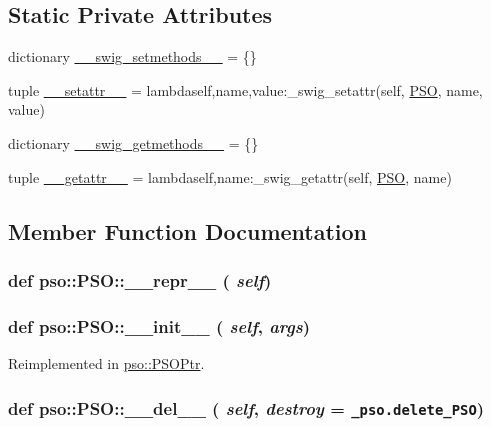 \subsection*{Static Private Attributes}
\begin{CompactItemize}
\item 
dictionary \hyperlink{classpso_1_1PSO_9b9529b86719f29355bd164b670caee9}{\_\-\_\-swig\_\-setmethods\_\-\_\-} = \{\}
\item 
tuple \hyperlink{classpso_1_1PSO_b930bfec249a4f55df08ab0185e000a5}{\_\-\_\-setattr\_\-\_\-} = lambdaself,name,value:\_\-swig\_\-setattr(self, \hyperlink{classpso_1_1PSO}{PSO}, name, value)
\item 
dictionary \hyperlink{classpso_1_1PSO_db5792f0b3f1752edef791c69fb42812}{\_\-\_\-swig\_\-getmethods\_\-\_\-} = \{\}
\item 
tuple \hyperlink{classpso_1_1PSO_672d2392549b45dd0bbbabbfd77a9a18}{\_\-\_\-getattr\_\-\_\-} = lambdaself,name:\_\-swig\_\-getattr(self, \hyperlink{classpso_1_1PSO}{PSO}, name)
\end{CompactItemize}


\subsection{Member Function Documentation}
\hypertarget{classpso_1_1PSO_0225f828ac29fe3bb87a9a3be43dcc17}{
\subsubsection{\setlength{\rightskip}{0pt plus 5cm}def pso::PSO::\_\-\_\-repr\_\-\_\- ( {\em self})}}
\label{classpso_1_1PSO_0225f828ac29fe3bb87a9a3be43dcc17}


\hypertarget{classpso_1_1PSO_27a5c2096805e771388694c18aba01e0}{
\subsubsection{\setlength{\rightskip}{0pt plus 5cm}def pso::PSO::\_\-\_\-init\_\-\_\- ( {\em self}, \/   {\em args})}}
\label{classpso_1_1PSO_27a5c2096805e771388694c18aba01e0}




Reimplemented in \hyperlink{classpso_1_1PSOPtr_ef60e75e878d40de18fecc0758282744}{pso::PSOPtr}.\hypertarget{classpso_1_1PSO_051b2a3a8d5cd4a513969e3158d1ff40}{
\subsubsection{\setlength{\rightskip}{0pt plus 5cm}def pso::PSO::\_\-\_\-del\_\-\_\- ( {\em self}, \/   {\em destroy} = {\tt \_\-pso.delete\_\-PSO})}}
\label{classpso_1_1PSO_051b2a3a8d5cd4a513969e3158d1ff40}


